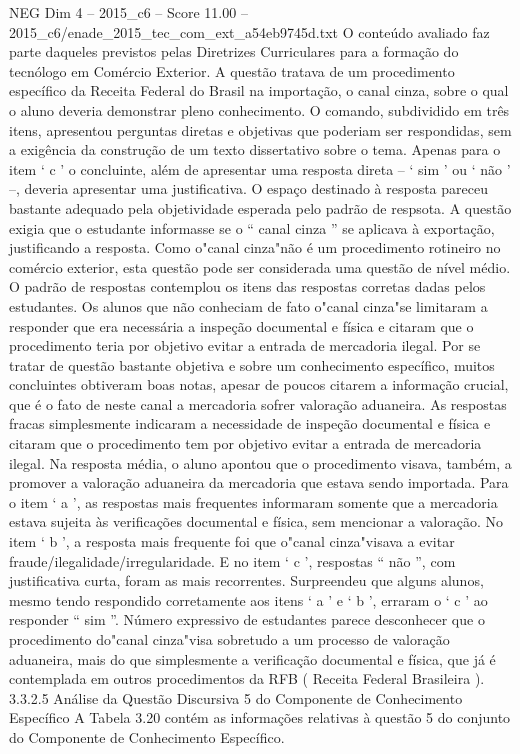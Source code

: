 \begin{textsample}{NEG Dim 4 – 2015\_c6 – Score 11.00 – 2015\_c6/enade\_2015\_tec\_com\_ext\_a54eb9745d.txt}
O conteúdo avaliado faz parte daqueles previstos pelas Diretrizes Curriculares para a formação do tecnólogo em Comércio Exterior.
A questão tratava de um procedimento específico da Receita Federal do Brasil na importação, o canal cinza, sobre o qual o aluno deveria demonstrar pleno conhecimento.
O comando, subdividido em três itens, apresentou perguntas diretas e objetivas que poderiam ser respondidas, sem a exigência da construção de um texto dissertativo sobre o tema.
Apenas para o item ‘ c ’ o concluinte, além de apresentar uma resposta direta – ‘ sim ’ ou ‘ não ’ –, deveria apresentar uma justificativa.
O espaço destinado à resposta pareceu bastante adequado pela objetividade esperada pelo padrão de respsota.
A questão exigia que o estudante informasse se o “ canal cinza ” se aplicava à exportação, justificando a resposta.
Como o"canal cinza"não é um procedimento rotineiro no comércio exterior, esta questão pode ser considerada uma questão de nível médio.
O padrão de respostas contemplou os itens das respostas corretas dadas pelos estudantes.
Os alunos que não conheciam de fato o"canal cinza"se limitaram a responder que era necessária a inspeção documental e física e citaram que o procedimento teria por objetivo evitar a entrada de mercadoria ilegal.
Por se tratar de questão bastante objetiva e sobre um conhecimento específico, muitos concluintes obtiveram boas notas, apesar de poucos citarem a informação crucial, que é o fato de neste canal a mercadoria sofrer valoração aduaneira.
As respostas fracas simplesmente indicaram a necessidade de inspeção documental e física e citaram que o procedimento tem por objetivo evitar a entrada de mercadoria ilegal.
Na resposta média, o aluno apontou que o procedimento visava, também, a promover a valoração aduaneira da mercadoria que estava sendo importada.
Para o item ‘ a ’, as respostas mais frequentes informaram somente que a mercadoria estava sujeita às verificações documental e física, sem mencionar a valoração.
No item ‘ b ’, a resposta mais frequente foi que o"canal cinza"visava a evitar fraude/ilegalidade/irregularidade.
E no item ‘ c ’, respostas “ não ”, com justificativa curta, foram as mais recorrentes.
Surpreendeu que alguns alunos, mesmo tendo respondido corretamente aos itens ‘ a ’ e ‘ b ’, erraram o ‘ c ’ ao responder “ sim ”.
Número expressivo de estudantes parece desconhecer que o procedimento do"canal cinza"visa sobretudo a um processo de valoração aduaneira, mais do que simplesmente a verificação documental e física, que já é contemplada em outros procedimentos da RFB ( Receita Federal Brasileira ). 3.3.2.5 Análise da Questão Discursiva 5 do Componente de Conhecimento Específico A Tabela 3.20 contém as informações relativas à questão 5 do conjunto do Componente de Conhecimento Específico.

\end{textsample}
